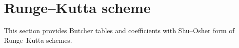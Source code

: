 \section{Runge--Kutta scheme}\label{sec:appendix_RK}
This section provides Butcher tables and coefficients with Shu--Osher form of Runge--Kutta schemes.


